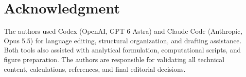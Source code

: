 \documentclass{ieeeojpel}
\begin{document}













\section*{Acknowledgment}
The authors used Codex (OpenAI, GPT-6 Astra) and Claude Code
(Anthropic, Opus 5.5) for language editing, structural organization,
and drafting assistance. Both tools also assisted with analytical
formulation, computational scripts, and figure preparation. The authors
are responsible for validating all technical content, calculations,
references, and final editorial decisions.



\end{document}
